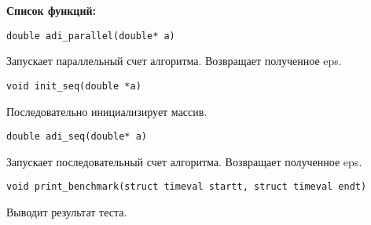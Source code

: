 \documentclass[a4paper,12pt,titlepage,draft]{article}
\begin{document}
\textbf{Список функций:}\\
\begin{verbatim}
double adi_parallel(double* a)
\end{verbatim}
Запускает параллельный счет алгоритма. Возвращает полученное eps.
\begin{verbatim}
void init_seq(double *a)
\end{verbatim}
Последовательно инициализирует массив.
\begin{verbatim}
double adi_seq(double* a)
\end{verbatim}
Запускает последовательный счет алгоритма. Возвращает полученное eps.
\begin{verbatim}
void print_benchmark(struct timeval startt, struct timeval endt)
\end{verbatim}
Выводит результат теста.
\newpage
\end{document}
